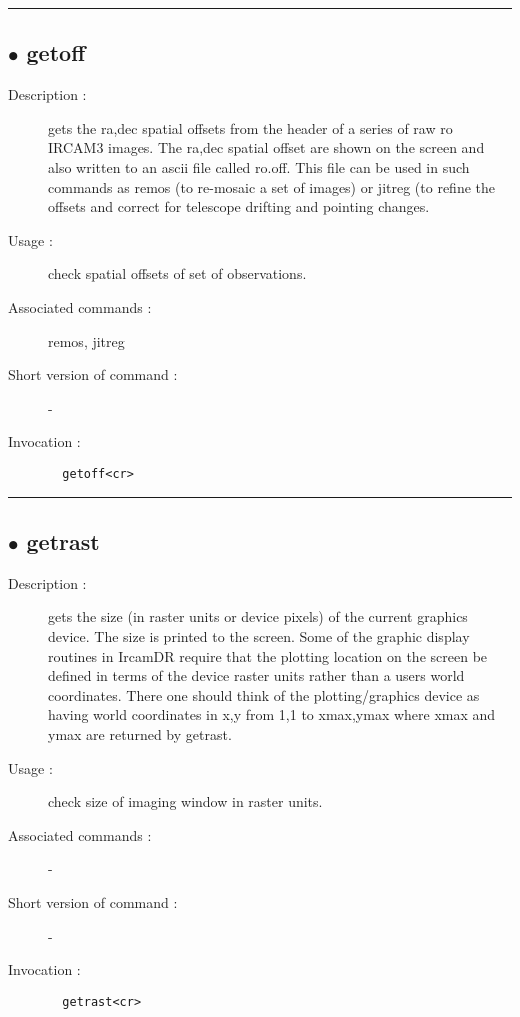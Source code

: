 \hrule \subsection*{$\bullet$ getoff}
\begin{description}
\item[Description :] gets the ra,dec spatial offsets from the header of a series of
raw ro {\sc IRCAM3} images.  The ra,dec spatial offset are shown on the screen
and also written to an ascii file called ro.off.  This file can be used
in such commands as remos (to re-mosaic a set of images) or jitreg (to
refine the offsets and correct for telescope drifting and pointing
changes.
\item[Usage :] check spatial offsets of set of observations.
\item[Associated commands :] remos, jitreg
\item[Short version of command :] -
\item[Invocation :]

\verb+  getoff<cr> +\end{description}

\hrule \subsection*{$\bullet$ getrast}
\begin{description}
\item[Description :] gets the size (in raster units or device pixels) of the current
graphics device. The size is printed to the screen.  Some of the graphic
display routines in IrcamDR require that the plotting location on the
screen be defined in terms of the device raster units rather than a users
world coordinates.  There one should think of the plotting/graphics device
as having world coordinates in x,y from 1,1 to xmax,ymax where xmax and
ymax are returned by getrast.
\item[Usage :] check size of imaging window in raster units.
\item[Associated commands :] -
\item[Short version of command :] -
\item[Invocation :]

\verb+  getrast<cr> +\end{description}

